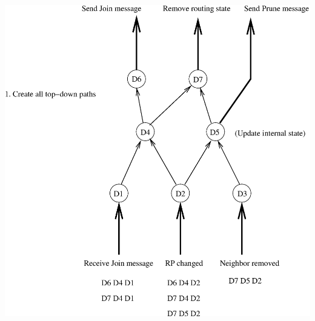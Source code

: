 \documentclass[landscape]{icsislides}
\begin{document}
\begin{slide}

\begin{center}
  \includegraphics[scale=0.6]{figs/pim_state_dependency2}
\end{center}

\end{slide}
\end{document}
